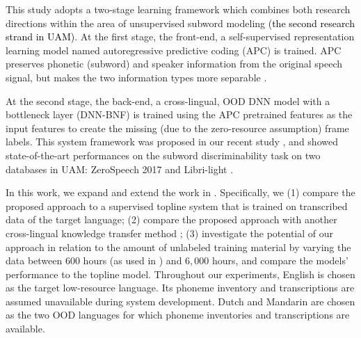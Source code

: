 \documentclass[transmag]{IEEEtran}
\begin{document}
This study adopts a two-stage learning framework which combines both research directions within the area of unsupervised subword modeling \textcolor{black}{(the second research strand in UAM)}. 
At the first stage, the front-end, a self-supervised representation learning model named autoregressive predictive coding (APC)   \cite{Chung2019}  is trained. APC preserves phonetic (subword) and speaker information from the original speech signal, but makes the two information types more separable \cite{Chung2019}. %

At the second stage, the back-end, a cross-lingual, OOD DNN model with a bottleneck layer (DNN-BNF) is trained using the APC pretrained features as the input features to create the missing (due to the zero-resource assumption) frame labels.
This system framework was proposed in our recent study \cite{feng2020unsupervised}, 
and showed state-of-the-art performances on the subword discriminability task on two databases in UAM: ZeroSpeech 2017 \cite{dunbar2017zero} and Libri-light \cite{kahn2019librilight}. 

In this work, we expand and extend the work in \cite{feng2020unsupervised}. Specifically, we (1) compare the proposed approach to a supervised topline system that is trained on transcribed data of the target language; (2) compare the proposed approach with another cross-lingual knowledge transfer method  \cite{shibata2017composite};
(3) investigate the potential of our approach in relation to the amount of unlabeled training material by varying the data between $600$ hours  (as used in \cite{feng2020unsupervised}) and $6,000$ hours, and compare the models' performance to the topline model. Throughout our experiments, English is chosen as the target low-resource language. Its phoneme inventory and transcriptions are assumed unavailable during system development. Dutch and Mandarin are chosen as the two OOD languages for which phoneme inventories and transcriptions are available.
\end{document}
